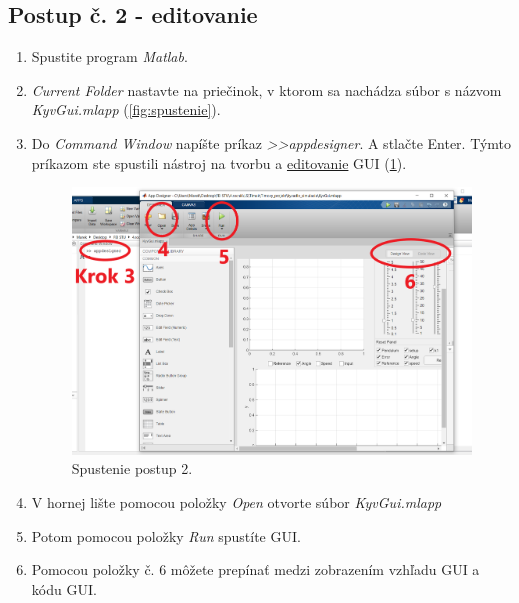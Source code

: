 \subsection{Postup č. 2 - editovanie}
\begin{enumerate}
	\item Spustite program \textit{Matlab}.
	\item \textit{Current Folder} nastavte na priečinok, v ktorom sa nachádza súbor s názvom \textit{KyvGui.mlapp} (\cref{fig:spustenie}).
	\item Do \textit{Command Window} napíšte príkaz \textit{>>appdesigner}. A stlačte Enter. Týmto príkazom ste spustili nástroj na tvorbu a \underline{editovanie} GUI (\cref{fig:spustenie2}).
	\begin{figure}[h!]
		\centering
		\includegraphics[width=0.9\linewidth]{spustenie2}
		\caption{Spustenie postup 2.}
		\label{fig:spustenie2}
	\end{figure}
    \item V hornej lište pomocou položky  \textit{Open} otvorte súbor \textit{KyvGui.mlapp}
    \item Potom pomocou položky  \textit{Run} spustíte GUI.
	\item Pomocou položky č. 6 môžete prepínať medzi zobrazením vzhľadu GUI a kódu GUI.
\end{enumerate}

\newpage
